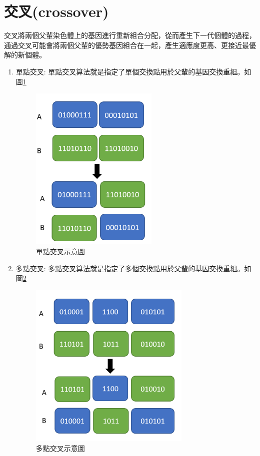 \section{交叉(crossover)}
交叉將兩個父輩染色體上的基因進行重新組合分配，從而產生下一代個體的過程，通過交叉可能會將兩個父輩的優勢基因組合在一起，產生適應度更高、更接近最優解的新個體。

\begin{enumerate}
	\item
	      單點交叉:
	      單點交叉算法就是指定了單個交換點用於父輩的基因交換重組。如圖\ref{fig:one}
	      \begin{figure}[H]
		      \centerline{\includegraphics[height=8cm]{pic/one.PNG}}
		      \caption{單點交叉示意圖}
		      \label{fig:one}
	      \end{figure}

	\item
	      多點交叉:
	      多點交叉算法就是指定了多個交換點用於父輩的基因交換重組。如圖\ref{fig:two}
	      \begin{figure}[H]
		      \centerline{\includegraphics[height=8cm]{pic/TWO.PNG}}
		      \caption{多點交叉示意圖}
		      \label{fig:two}
	      \end{figure}


\end{enumerate}
